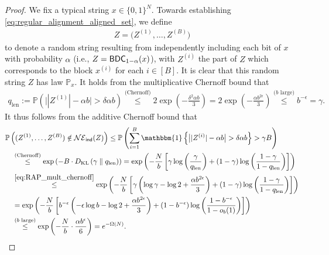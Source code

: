 \documentclass[11pt]{amsart}
\numberwithin{equation}{section}
\numberwithin{equation}{section}
\newcommand{\1}{\mathbbm{1}}
\newcommand{\KL}{D_{\mathrm{KL}}}
\newcommand{\Prob}{\mathbb{P}}
\newcommand{\doubleline}{\;\middle\|\;}
\newcommand{\BDC}{\textup{\textsf{BDC}}}
\newcommand{\ind}{\textup{\textsf{ind}}}
\theoremstyle{definition}
\begin{document}
\begin{appendices}
\begin{proof}
    We fix a typical string $x \in \{0,1\}^N$. Towards establishing \eqref{eq:regular_alignment_aligned_set}, we define 
    \begin{align*}
        Z = \big(Z^{(1)}, \dots, Z^{(B)}\big)
    \end{align*}
    to denote a random string resulting from independently including each bit of $x$ with probability $\alpha$ (i.e., $Z = \BDC_{1-\alpha}(x)$), with $Z^{(i)}$ the part of $Z$ which corresponds to the block $x^{(i)}$ for each $i \in [B]$. It is clear that this random string $Z$ has law $\Prob_x$. It holds from the multiplicative Chernoff bound that
    \begin{align} \label{eq:RAP_mult_chernoff}
        q_{\text{len}} := \Prob\left( \big| |Z^{(1)}| - \alpha b \big| > \delta \alpha b \right) \stackrel{\text{(Chernoff)}}{\leq} 2\exp\left( - \frac{\delta^2 \alpha b}{3} \right) = 2\exp\left( -\frac{\alpha b^{2\epsilon}}{3} \right) \stackrel{\text{($b$ large)}}{\leq} b^{-\epsilon} = \gamma.
    \end{align}
    It thus follows from the additive Chernoff bound that
    \begin{align}
        & \Prob\left( (Z^{(1)}, \dots, Z^{(B)}) \notin \mathcal{NE}_\ind(Z) \right) \leq \Prob\left( \sum_{i=1}^B \1\left\{\big| |Z^{(i)}| - \alpha b \big| > \delta \alpha b \right\} > \gamma B \right) \nonumber \\
        & \quad \stackrel{\text{(Chernoff)}}{\leq} \exp\left( -B \cdot \KL\left( \gamma \doubleline q_{\text{len}} \right) \right) = \exp\left( -\frac{N}{b} \left[ \gamma \log\left( \frac{\gamma}{q_{\text{len}}} \right) + (1-\gamma) \log\left( \frac{1-\gamma}{1-q_{\text{len}}} \right) \right] \right) \nonumber \\
        & \quad \stackrel{\eqref{eq:RAP_mult_chernoff}}{\leq} \exp\left( -\frac{N}{b} \left[ \gamma \left( \log \gamma - \log 2 + \frac{\alpha b^{2\epsilon}}{3} \right) + (1-\gamma) \log\left( \frac{1-\gamma}{1-q_{\text{len}}} \right) \right] \right) \nonumber \\
        & \quad = \exp\left( -\frac{N}{b} \left[ b^{-\epsilon} \left( -\epsilon \log b - \log 2 + \frac{\alpha b^{2\epsilon}}{3} \right) + (1-b^{-\epsilon}) \log\left( \frac{1-b^{-\epsilon}}{1-o_b(1)} \right) \right] \right) \nonumber \\
        & \quad \stackrel{\text{($b$ large)}}{\leq} \exp\left( - \frac{N}{b} \cdot \frac{\alpha b^\epsilon}{6} \right) = e^{-\Omega(N)}. \label{eq:RAP_additive_chernoff}

\end{align}
\end{proof}
\end{appendices}
\end{document}
